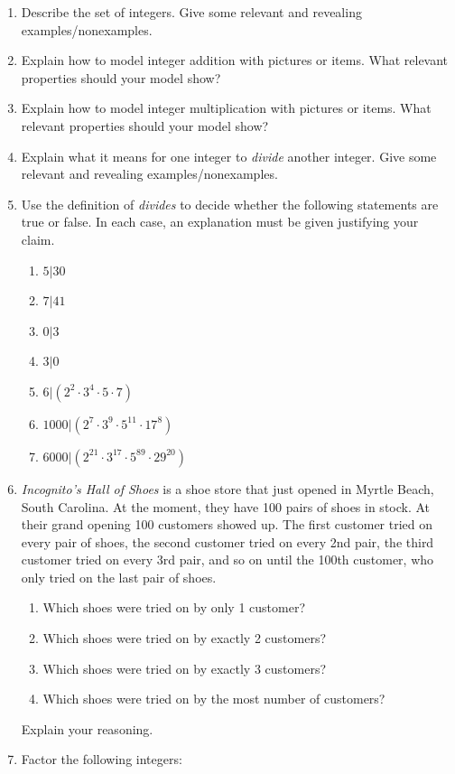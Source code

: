 \begin{problems}
\begin{enumerate}
\item Describe the set of integers. Give some relevant and revealing
  examples/nonexamples.
\item Explain how to model integer addition with pictures or
  items. What relevant properties should your model show?
\item Explain how to model integer multiplication with pictures or
  items. What relevant properties should your model show?
\item Explain what it means for one integer to \textit{divide} another
  integer. Give some relevant and revealing examples/nonexamples.
\item Use the definition of \textit{divides} to decide whether the
  following statements are true or false. In each case, an explanation must 
be given justifying your claim.
\begin{enumerate}
\item $5|30$
\item $7|41$
\item $0|3$
\item $3|0$
\item $6|(2^2\cdot 3^4\cdot 5 \cdot 7)$
\item $1000|(2^7\cdot 3^9\cdot 5^{11}\cdot 17^8)$
\item $6000|(2^{21}\cdot 3^{17}\cdot 5^{89}\cdot 29^{20})$
\end{enumerate}
\item \textit{Incognito's Hall of Shoes} is a shoe store that just
  opened in Myrtle Beach, South Carolina. At the moment, they have 100
  pairs of shoes in stock. At their grand opening 100 customers showed
  up. The first customer tried on every pair of shoes, the second
  customer tried on every 2nd pair, the third customer tried on every
  3rd pair, and so on until the 100th customer, who only tried on the
  last pair of shoes.
\begin{enumerate}
\item Which shoes were tried on by only 1 customer?
\item Which shoes were tried on by exactly 2 customers?
\item Which shoes were tried on by exactly 3 customers?
\item Which shoes were tried on by the most number of customers?
\end{enumerate}
Explain your reasoning.
\item Factor the following integers:

\end{enumerate}
\end{problems}
